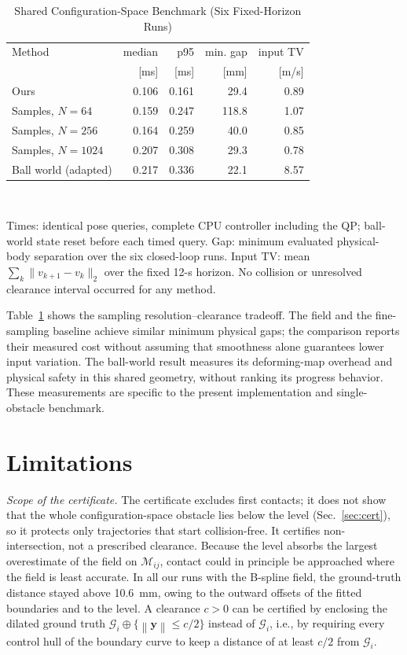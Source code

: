 \documentclass[journal]{IEEEtran}
\theoremstyle{definition}
\newcommand{\norm}[1]{\left\lVert #1\right\rVert}
\newcommand{\Mset}{\mathcal{M}}
\begin{document}
\begin{table}[t]
\caption{Shared Configuration-Space Benchmark (Six Fixed-Horizon Runs)}
\label{tab:three-baselines}
\centering\footnotesize
\setlength{\tabcolsep}{3pt}
\begin{tabular}{lrrrr}
\toprule
Method & median & p95 & min. gap & input TV\\
 & [ms] & [ms] & [mm] & [m/s]\\
\midrule
Ours & 0.106 & 0.161 & 29.4 & 0.89 \\
Samples, $N=64$ & 0.159 & 0.247 & 118.8 & 1.07 \\
Samples, $N=256$ & 0.164 & 0.259 & 40.0 & 0.85 \\
Samples, $N=1024$ & 0.207 & 0.308 & 29.3 & 0.78 \\
Ball world (adapted) & 0.217 & 0.336 & 22.1 & 8.57 \\
\bottomrule
\end{tabular}
\\[3pt]
\parbox{\columnwidth}{\footnotesize Times: identical pose queries, complete CPU
controller including the QP; ball-world state reset before each timed query.
Gap: minimum evaluated physical-body separation over the six closed-loop runs.
Input TV: mean $\sum_k\|v_{k+1}-v_k\|_2$ over the fixed 12-s horizon.
No collision or unresolved clearance interval occurred for any method.}
\end{table}

Table~\ref{tab:three-baselines} shows the sampling resolution--clearance tradeoff.
The field and the fine-sampling baseline achieve similar minimum physical gaps;
the comparison reports their measured cost without assuming that smoothness
alone guarantees lower input variation. The ball-world result measures its
deforming-map overhead and physical safety in this shared geometry, without
ranking its progress behavior. These measurements are specific to the present
implementation and single-obstacle benchmark.

\section{Limitations}\label{sec:limits}
\emph{Scope of the certificate.} The certificate excludes first contacts; it does not show that the
whole configuration-space obstacle lies below the level (Sec.~\ref{sec:cert}), so it protects only
trajectories that start collision-free. It certifies non-intersection, not a prescribed clearance.
Because the level absorbs the largest overestimate of the field on $\Mset_{ij}$, contact could in
principle be approached where the field is least accurate. In all our runs with the B-spline field,
the ground-truth distance stayed above 10.6~mm, owing to the outward offsets of the fitted
boundaries and to the level. A clearance $c>0$ can be certified by enclosing the dilated ground truth
$\mathcal G_i\oplus\{\norm{\mathbf y}\le c/2\}$ instead of $\mathcal G_i$, i.e., by requiring every
control hull of the boundary curve to keep a distance of at least $c/2$ from $\mathcal G_i$.
\end{document}
